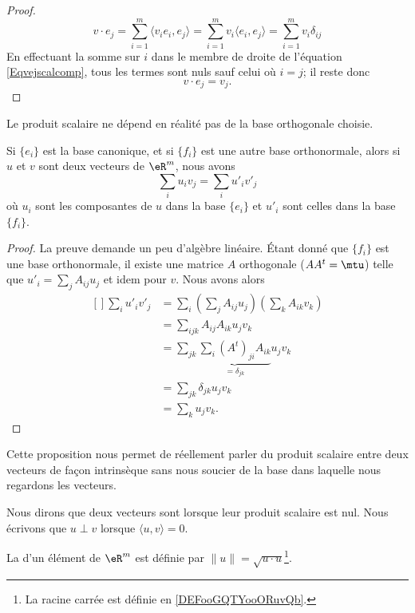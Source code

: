 \begin{proof}
	\begin{equation}		\label{Eqvejscalcomp}
		v\cdot e_j=\sum_{i=1}^m\langle v_ie_i, e_j\rangle =\sum_{i=1}^mv_i\langle e_i, e_j\rangle =\sum_{i=1}^mv_i\delta_{ij}
	\end{equation}
	En effectuant la somme sur $i$ dans le membre de droite de l'équation \eqref{Eqvejscalcomp}, tous les termes sont nuls sauf celui où $i=j$; il reste donc
	\begin{equation}
		v\cdot e_j=v_j.
	\end{equation}
\end{proof}

Le produit scalaire ne dépend en réalité pas de la base orthogonale choisie.

\begin{lemma}
	Si $\{ e_i \}$ est la base canonique, et si $\{ f_i \}$ est une autre base orthonormale, alors si $u$ et $v$ sont deux vecteurs de $\eR^m$, nous avons
	\begin{equation}
		\sum_i u_iv_j=\sum_iu'_iv'_j
	\end{equation}
	où $u_i$ sont les composantes de $u$ dans la base $\{ e_i \}$ et $u'_i$ sont celles dans la base $\{ f_i \}$.
\end{lemma}

\begin{proof}
	La preuve demande un peu d'algèbre linéaire. Étant donné que $\{ f_i \}$ est une base orthonormale, il existe une matrice $A$ orthogonale ($AA^t=\mtu$) telle que $u'_i=\sum_jA_{ij}u_j$ et idem pour $v$. Nous avons alors
	\begin{equation}
		\begin{aligned}[]
			\sum_iu'_iv'_j&=\sum_i\left( \sum_jA_{ij} u_j\right)\left( \sum_k A_{ik}v_k \right)\\
			&=\sum_{ijk}A_{ij}A_{ik}u_jv_k\\
			&=\sum_{jk}\underbrace{\sum_i(A^t)_{ji}A_{ik}}_{=\delta_{jk}}u_jv_k\\
			&=\sum_{jk}\delta_{jk}u_jv_k\\
			&=\sum_ku_jv_k.
		\end{aligned}
	\end{equation}
\end{proof}

Cette proposition nous permet de réellement parler du produit scalaire entre deux vecteurs de façon intrinsèque sans nous soucier de la base dans laquelle nous regardons les vecteurs.

Nous dirons que deux vecteurs sont  lorsque leur produit scalaire est nul. Nous écrivons que $u\perp v$ lorsque $\langle u, v\rangle =0$.
\begin{definition}	\label{DefNormeEucleApp}
    La  d'un élément de $\eR^m$ est définie par $\| u \|=\sqrt{u\cdot u}$\footnote{La racine carrée est définie en \ref{DEFooGQTYooORuvQb}.}.
\end{definition}

